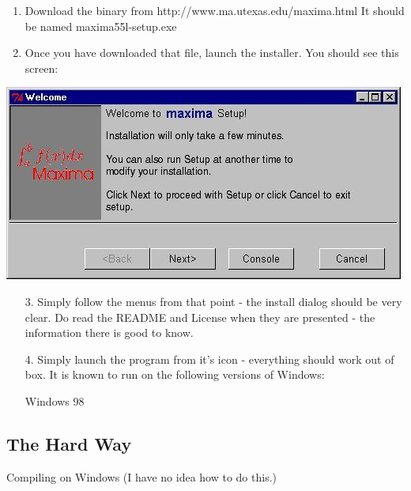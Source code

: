 \begin{enumerate}
\item Download the binary from http://www.ma.utexas.edu/maxima.html
It should be named maxima55l-setup.exe
\item Once you have downloaded that file, launch the installer. You
should see this screen:
\end{enumerate}
\vspace{0.3cm}
{\centering \includegraphics{images/maximawindowsinstall1}}
\vspace{0.3cm}
\begin{enumerate}
\item [3.]Simply follow the menus from that point - the install dialog
should be very clear. Do read the README and License when they are
presented - the information there is good to know.
\item [4.]Simply launch the program from it's icon - everything should work
out of box. It is known to run on the following versions of Windows:

\vspace{3ex}

Windows 98

\end{enumerate}

\subsection{The Hard Way}

Compiling on Windows (I have no idea how to do this.)
